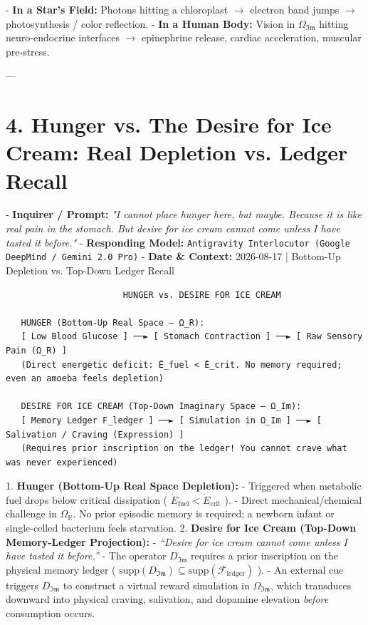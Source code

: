 \documentclass[11pt,a4paper]{article}
\theoremstyle{definition}
\theoremstyle{remark}
\begin{document}
- \textbf{In a Star's Field:} Photons hitting a chloroplast $\to$ electron band jumps $\to$ photosynthesis / color reflection.
- \textbf{In a Human Body:} Vision in $\Omega_{\mathfrak{Im}}$ hitting neuro-endocrine interfaces $\to$ epinephrine release, cardiac acceleration, muscular pre-stress.

---

\section{4. Hunger vs. The Desire for Ice Cream: Real Depletion vs. Ledger Recall}

- \textbf{Inquirer / Prompt:} \textit{"I cannot place hunger here, but maybe. Because it is like real pain in the stomach. But desire for ice cream cannot come unless I have tasted it before."}
- \textbf{Responding Model:} \texttt{Antigravity Interlocutor (Google DeepMind / Gemini 2.0 Pro)}
- \textbf{Date \& Context:} 2026-08-17 | Bottom-Up Depletion vs. Top-Down Ledger Recall

\begin{verbatim}
                       HUNGER vs. DESIRE FOR ICE CREAM
                       
   HUNGER (Bottom-Up Real Space — Ω_R):
   [ Low Blood Glucose ] ──► [ Stomach Contraction ] ──► [ Raw Sensory Pain (Ω_R) ]
   (Direct energetic deficit: Ė_fuel < Ė_crit. No memory required; even an amoeba feels depletion)

   DESIRE FOR ICE CREAM (Top-Down Imaginary Space — Ω_Im):
   [ Memory Ledger F_ledger ] ──► [ Simulation in Ω_Im ] ──► [ Salivation / Craving (Expression) ]
   (Requires prior inscription on the ledger! You cannot crave what was never experienced)
\end{verbatim}

1. \textbf{Hunger (Bottom-Up Real Space Depletion):}
- Triggered when metabolic fuel drops below critical dissipation ( $\dot{E}_{\text{fuel}} < \dot{E}_{\text{crit}}$ ).
- Direct mechanical/chemical challenge in $\Omega_{\mathbb{R}}$. No prior episodic memory is required; a newborn infant or single-celled bacterium feels starvation.
2. \textbf{Desire for Ice Cream (Top-Down Memory-Ledger Projection):}
- \textit{“Desire for ice cream cannot come unless I have tasted it before.”}
- The operator $D_{\mathfrak{Im}}$ requires a prior inscription on the physical memory ledger ( $\mathrm{supp}(D_{\mathfrak{Im}}) \subseteq \mathrm{supp}(\mathcal{F}_{\text{ledger}})$ ).
- An external cue triggers $D_{\mathfrak{Im}}$ to construct a virtual reward simulation in $\Omega_{\mathfrak{Im}}$, which transduces downward into physical craving, salivation, and dopamine elevation \textit{before} consumption occurs.
\end{document}
